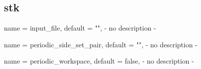 \subsection{stk}

\begin{parameter}{
    name    = {input_file},
    default = {""},
}
- no description -
\end{parameter}

\begin{parameter}{
    name    = {periodic_side_set_pair},
    default = {""},
}
- no description -
\end{parameter}

\begin{parameter}{
    name    = {periodic_workspace},
    default = {false},
}
- no description -
\end{parameter}

